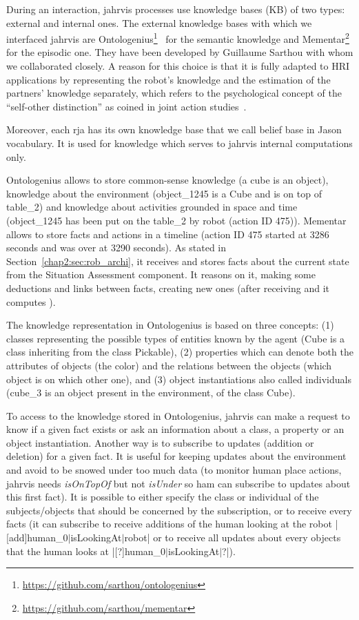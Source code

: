 \documentclass[a4paper,11pt,twoside]{StyleThese}
\begin{document}
During an interaction, \acrshort{jahrvis} processes use knowledge bases (KB) of two types: external and internal ones. The external knowledge bases with which we interfaced \acrshort{jahrvis} are Ontologenius\footnote{\url{https://github.com/sarthou/ontologenius}}~\cite{sarthou_2019_ontologenius} for the semantic knowledge and Mementar\footnote{\url{https://github.com/sarthou/mementar}} for the episodic one. They have been developed by Guillaume Sarthou with whom we collaborated closely. A reason for this choice is that it is fully adapted to HRI applications by representing the robot's knowledge and the estimation of the partners' knowledge separately, which refers to the psychological concept of the ``self-other distinction'' as coined in joint action studies~\cite{pacherie_2012_agency}. 

Moreover, each \acrshort{rja} has its own knowledge base that we call belief base in Jason vocabulary. It is used for knowledge which serves to \acrshort{jahrvis} internal computations only.

Ontologenius allows to store common-sense knowledge (\eg a cube is an object), knowledge about the environment (\eg object\_1245 is a Cube and is on top of table\_2) and knowledge about activities grounded in space and time (\eg object\_1245 has been put on the table\_2 by robot (action ID 475)). Mementar allows to store facts and actions in a timeline (\eg action ID 475 started at 3286 seconds and was over at 3290 seconds). As stated in Section~\ref{chap2:sec:rob_archi}, it receives and stores facts about the current state from the Situation Assessment component. It reasons on it, making some deductions and links between facts, creating new ones (\eg after receiving  and it computes ). 

The knowledge representation in Ontologenius is based on three concepts: (1) classes representing the possible types of entities known by the agent (\eg Cube is a class inheriting from the class Pickable), (2) properties which can denote both the attributes of objects (\eg the color) and the relations between the objects (\eg which object is on which other one), and (3) object instantiations also called individuals (\eg cube\_3 is an object present in the environment, of the class Cube).

To access to the knowledge stored in Ontologenius, \acrshort{jahrvis} can make a request to know if a given fact exists or ask an information about a class, a property or an object instantiation. Another way is to subscribe to updates (addition or deletion) for a given fact. It is useful for keeping updates about the environment and avoid to be snowed under too much data (\eg to monitor human place actions, \acrshort{jahrvis} needs \textit{isOnTopOf} but not \textit{isUnder} so \acrlong{ham} can subscribe to updates about this first fact). It is possible to either specify the class or individual of the subjects/objects that should be concerned by the subscription, or to receive every facts (\eg it can subscribe to receive additions of the human looking at the robot |[add]human_0$\lvert$isLookingAt$\lvert$robot| or to receive all updates about every objects that the human looks at |[?]human_0$\lvert$isLookingAt$\lvert$?|).
\end{document}
